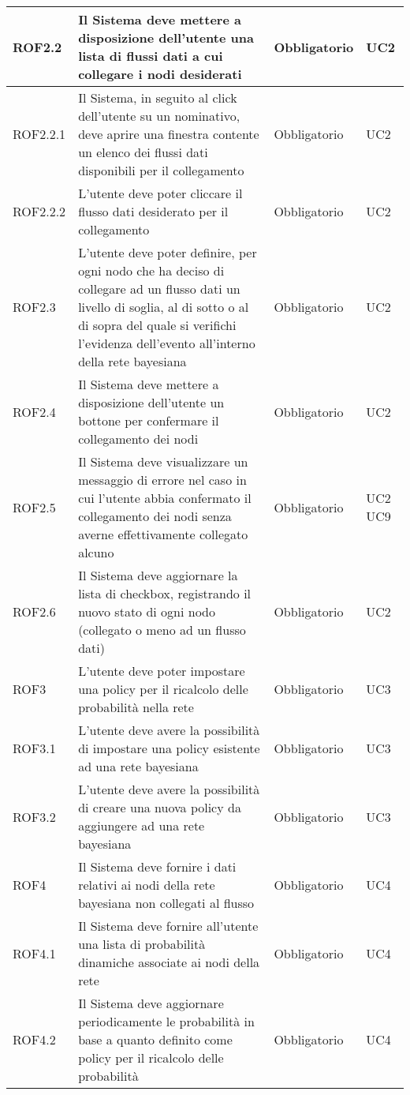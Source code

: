 \begin{center}
\begin{longtable}[c]{|m{}|m{}|m{}|m{}|}
\hline
\rowcolor{grigio}ROF2.2 & Il Sistema deve mettere a disposizione dell'utente una lista di flussi dati a cui collegare i nodi desiderati & Obbligatorio & UC2\\
\hline
ROF2.2.1 & Il Sistema, in seguito al click dell'utente su un nominativo, deve aprire una finestra contente un elenco dei flussi dati disponibili per il collegamento & Obbligatorio & UC2\\
\hline
\rowcolor{grigio}ROF2.2.2 & L'utente deve poter cliccare il flusso dati desiderato per il collegamento & Obbligatorio & UC2\\
\hline
ROF2.3 & L'utente deve poter definire, per ogni nodo che ha deciso di collegare ad un flusso dati un livello di soglia, al di sotto o al di sopra del quale si verifichi l'evidenza dell'evento all'interno della rete bayesiana & Obbligatorio & UC2\\
\hline
\rowcolor{grigio}ROF2.4 & Il Sistema deve mettere a disposizione dell'utente un bottone per confermare il collegamento dei nodi & Obbligatorio & UC2\\
\hline
ROF2.5 & Il Sistema deve visualizzare un messaggio di errore nel caso in cui l'utente abbia confermato il collegamento dei nodi senza averne effettivamente collegato alcuno & Obbligatorio & UC2 UC9\\
\hline
\rowcolor{grigio}ROF2.6 & Il Sistema deve aggiornare la lista di checkbox, registrando il nuovo stato di ogni nodo (collegato o meno ad un flusso dati) & Obbligatorio & UC2\\
\hline
ROF3 & L'utente deve poter impostare una policy per il ricalcolo delle probabilità nella rete & Obbligatorio & UC3\\
\hline
\rowcolor{grigio}ROF3.1 & L'utente deve avere la possibilità di impostare una policy esistente ad una rete bayesiana  & Obbligatorio & UC3\\ 
\hline
ROF3.2 & L'utente deve avere la possibilità di creare una nuova policy da aggiungere ad una rete bayesiana & Obbligatorio & UC3\\
\hline
\rowcolor{grigio}ROF4 & Il Sistema deve fornire i dati relativi ai nodi della rete bayesiana non collegati al flusso & Obbligatorio & UC4\\
\hline
ROF4.1 & Il Sistema deve fornire all'utente una lista di probabilità dinamiche associate ai nodi della rete & Obbligatorio & UC4\\
\hline
\rowcolor{grigio}ROF4.2 & Il Sistema deve aggiornare periodicamente le probabilità in base a quanto definito come policy per il ricalcolo delle probabilità & Obbligatorio & UC4\\

\end{longtable}
\end{center}
